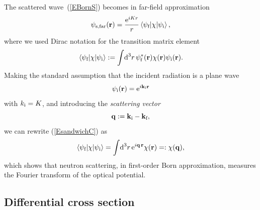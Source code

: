 The scattered wave~(\ref{EBornS})
becomes in far-field approximation 
\begin{equation}\label{EsandwichC}
  \psi_\text{s,far}(\mathbf{r})
  = \frac{\text{e}^{iKr}}{r}
    \left\langle \psi_{\text{f}}|\chi|\psi_{\text{i}}\right\rangle,
\end{equation}
%
where we used Dirac notation for the transition matrix element
%
\begin{equation}\label{Etrama}
  \left\langle \psi_{\text{f}}|\chi|\psi_{\text{i}}\right\rangle
  := \int\!\text{d}^3r\, \psi^*_{\text{f}}(\mathbf{r})\chi(\mathbf{r})\psi_{\text{i}}(\mathbf{r}).
\end{equation}
%
Making the standard assumption
that the incident radiation is a plane wave
\begin{equation}\label{EPsi0Plane}
  \psi_{\text{i}}(\mathbf{r})=\text{e}^{i \mathbf{k}_{\text{i}} \mathbf{r}}
\end{equation}
with $k_{\text{i}}=K$,
and introducing the \textit{scattering vector}
%
\begin{equation}
  \mathbf{q}:=\mathbf{k}_{\text{i}}-\mathbf{k}_{\text{f}},
\end{equation}
%
we can rewrite (\ref{EsandwichC}) as
\begin{equation}\label{EBornQ}
  \left\langle \psi_{\text{f}}|\chi|\psi_{\text{i}}\right\rangle
  = \int\!\text{d}^3r\, \text{e}^{i\mathbf{q}\,\mathbf{r}}\chi(\mathbf{r})
  =: \chi(\mathbf{q}),
\end{equation}
%
which shows that neutron scattering,
in first-order Born approximation,
measures the Fourier transform
of the optical potential.
%

%

\subsection{Differential cross section}

